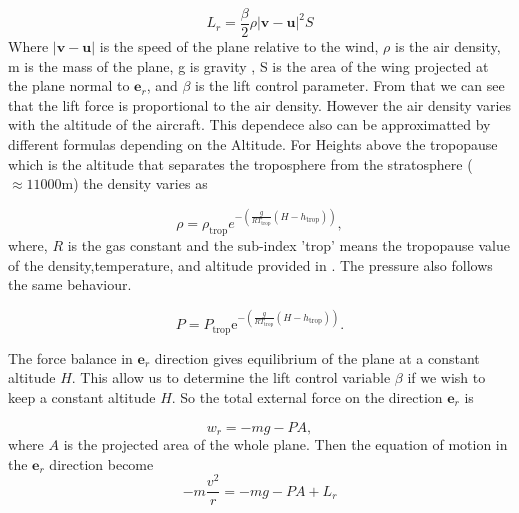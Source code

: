 \documentclass{article}
\renewcommand{\vec}[1]{\boldsymbol{#1}}
\begin{document}
\begin{equation}
    L_r= \frac{\beta }{2} \rho |\vec{v}- \vec{u}|^2S
\end{equation}
Where $|\vec{v}-\vec{u}|$ is the speed of the plane relative to the wind, $\rho$ is the air density, m is the mass of the plane, g is gravity , S is the area of the wing  projected at the plane normal to $\vec{e}_r$, and $\beta$ is the lift control parameter. From that we can see that the lift force is proportional to the air density. However the air density varies with the altitude of the aircraft. This dependece also can be approximatted by different formulas depending on the Altitude. For Heights above the tropopause  \cite{nuic2004bada} which is the altitude that separates the troposphere from the stratosphere ($\approx 11000$m) the density varies as

\begin{equation}
    \rho= \rho_{\text{trop}}e^{-\left( \frac{g}{RT_{\text{trop}}}(H-h_{\text{trop}}) \right)},
\end{equation}
where, $R$ is the gas constant  and the sub-index 'trop' means the tropopause value of the density,temperature, and altitude provided in \cite{nuic2004bada}. The pressure also follows the same behaviour.

\begin{equation}
    P= P_{\text{trop}}\mathrm{e}^{-\left( \frac{g}{RT_{\text{trop}}}(H-h_{\text{trop}}) \right)}.
\end{equation}
 

The force balance in $\vec{e}_r$ direction gives equilibrium of the plane at a constant altitude $H$. This allow us to determine the lift control variable $\beta$ if we wish to keep a constant altitude $H$. So the total external force on the direction $\vec{e}_r$ is 

\begin{equation}
    w_r=-mg -PA ,
\end{equation}
where $A$ is the projected area of the whole plane. Then the equation of motion in the $\vec{e}_r$ direction become
\begin{equation}
    -m\frac{v^2}{r}=-mg- PA +L_r
\end{equation}
\end{document}
